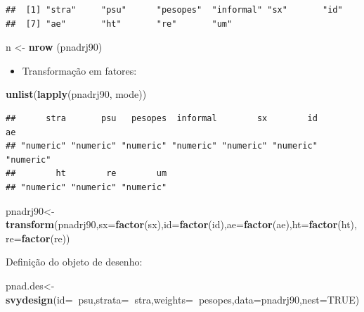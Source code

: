 \documentclass[]{book}
\newenvironment{Shaded}{\begin{snugshade}}{\end{snugshade}}
\newcommand{\KeywordTok}[1]{\textcolor[rgb]{0.13,0.29,0.53}{\textbf{#1}}}
\newcommand{\DataTypeTok}[1]{\textcolor[rgb]{0.13,0.29,0.53}{#1}}
\newcommand{\StringTok}[1]{\textcolor[rgb]{0.31,0.60,0.02}{#1}}
\newcommand{\OtherTok}[1]{\textcolor[rgb]{0.56,0.35,0.01}{#1}}
\newcommand{\OperatorTok}[1]{\textcolor[rgb]{0.81,0.36,0.00}{\textbf{#1}}}
\newcommand{\NormalTok}[1]{#1}
\providecommand{\tightlist}{%
  \setlength{\itemsep}{0pt}\setlength{\parskip}{0pt}}
\theoremstyle{definition}
\theoremstyle{definition}
\theoremstyle{definition}
\theoremstyle{remark}
\begin{document}
\begin{verbatim}
##  [1] "stra"     "psu"      "pesopes"  "informal" "sx"       "id"      
##  [7] "ae"       "ht"       "re"       "um"
\end{verbatim}

\begin{Shaded}
\begin{Highlighting}[]
\NormalTok{n <-}\StringTok{ }\KeywordTok{nrow}\NormalTok{ (pnadrj90)}
\end{Highlighting}
\end{Shaded}

\begin{itemize}
\tightlist
\item
  Transformação em fatores:
\end{itemize}

\begin{Shaded}
\begin{Highlighting}[]
\KeywordTok{unlist}\NormalTok{(}\KeywordTok{lapply}\NormalTok{(pnadrj90, mode))}
\end{Highlighting}
\end{Shaded}

\begin{verbatim}
##      stra       psu   pesopes  informal        sx        id        ae 
## "numeric" "numeric" "numeric" "numeric" "numeric" "numeric" "numeric" 
##        ht        re        um 
## "numeric" "numeric" "numeric"
\end{verbatim}

\begin{Shaded}
\begin{Highlighting}[]
\NormalTok{pnadrj90<-}\KeywordTok{transform}\NormalTok{(pnadrj90,}\DataTypeTok{sx=}\KeywordTok{factor}\NormalTok{(sx),}\DataTypeTok{id=}\KeywordTok{factor}\NormalTok{(id),}\DataTypeTok{ae=}\KeywordTok{factor}\NormalTok{(ae),}\DataTypeTok{ht=}\KeywordTok{factor}\NormalTok{(ht),}\DataTypeTok{re=}\KeywordTok{factor}\NormalTok{(re))}
\end{Highlighting}
\end{Shaded}

Definição do objeto de desenho:

\begin{Shaded}
\begin{Highlighting}[]
\NormalTok{pnad.des<-}\KeywordTok{svydesign}\NormalTok{(}\DataTypeTok{id=}\OperatorTok{~}\NormalTok{psu,}\DataTypeTok{strata=}\OperatorTok{~}\NormalTok{stra,}\DataTypeTok{weights=}\OperatorTok{~}\NormalTok{pesopes,}\DataTypeTok{data=}\NormalTok{pnadrj90,}\DataTypeTok{nest=}\OtherTok{TRUE}\NormalTok{)}
\end{Highlighting}
\end{Shaded}
\end{document}
